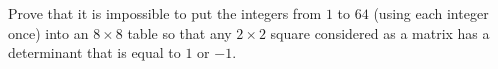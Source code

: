 \documentclass[paper=6.125in:9.25in,twoside,openright,pagesize=pdftex,10pt]{scrbook}
\begin{document}
\begin{problem}
Prove that it is impossible to put the integers from $1$ to $64$ (using each integer once) into an $8\times 8$ table so that any $2\times 2$ square considered as a matrix has a determinant that is equal to $1$ or $-1$.
\end{problem}
\end{document}
